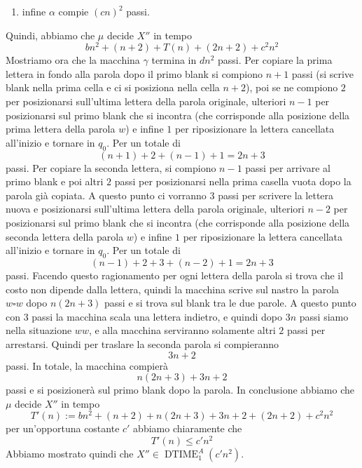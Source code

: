 \begin{sol}
\begin{enumerate}
    \item infine $\alpha$ compie $(cn)^2$ passi.
    \end{enumerate}
    Quindi, abbiamo che $\mu$
    decide $X''$ in tempo
    \[
    bn^2 + (n+2) + T(n) + (2n+2) + c^2n^2
    \]
    Mostriamo ora che la macchina $\gamma$ termina in
    $dn^2$ passi.
    Per copiare la prima lettera
in fondo alla parola dopo
il primo blank si compiono $n+1$ passi (si scrive blank nella prima cella e ci si posiziona nella cella $n+2$),
poi se ne compiono $2$ per posizionarsi
sull'ultima lettera della parola originale,
ulteriori $n-1$ per posizionarsi sul primo blank
che si incontra (che corrisponde alla posizione della prima lettera della parola $w$)
e infine $1$ per riposizionare la lettera
cancellata all'inizio e tornare in $q_0$.
Per un totale di
\[
    (n+1)+ 2 + (n-1) + 1 = 2n+3
\]
passi.
Per copiare la seconda lettera,
si compiono
$n-1$ passi per arrivare al primo blank
e poi altri $2$ passi per posizionarsi
nella prima casella vuota dopo la parola già copiata.
A questo punto ci vorranno $3$ passi
per scrivere la lettera nuova e posizionarsi
sull'ultima lettera della parola originale,
ulteriori $n-2$ per posizionarsi sul primo blank
che si incontra (che corrisponde alla posizione della seconda lettera della parola $w$)
e infine $1$ per riposizionare la lettera
cancellata all'inizio e tornare in $q_0$.
Per un totale di
\[
    (n-1)+ 2 + 3+ (n-2) + 1=2n+3
\]
passi.
Facendo questo ragionamento per ogni lettera della parola
si trova che il costo non dipende dalla lettera,
quindi la macchina scrive sul nastro la parola
$w\square w$ dopo $n(2n+3)$ passi e si trova sul
blank tra le due parole.
    A questo punto con $3$ passi
    la macchina scala una lettera indietro, e quindi dopo $3n$
    passi siamo nella situazione $ww$, e alla macchina 
    serviranno solamente altri $2$ passi per arrestarsi.
    Quindi per traslare la seconda parola si compieranno
    \[
    3n+2
    \]
    passi.
    In totale, la macchina compierà 
    \[
    n(2n+3) +3n+2
    \]
    passi e si posizionerà sul primo blank dopo la parola.
    In conclusione abbiamo che $\mu$ decide $X''$ in tempo
    \[
        T'(n):=bn^2 + (n+2) + n(2n+3) +3n+2 + (2n+2) + c^2n^2
    \]
    per un'opportuna costante $c'$ abbiamo chiaramente che
    \[
    T'(n) \leq c'n^2
    \]
    Abbiamo mostrato quindi che
    $X'' \in \operatorname{DTIME}_1^A(c'n^2)$.
\end{sol}